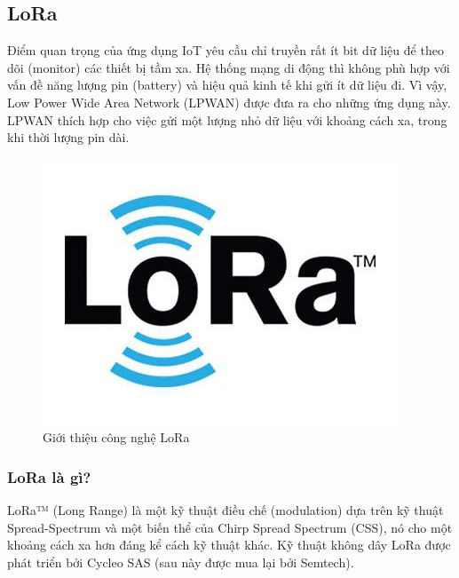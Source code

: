 \subsection{LoRa}
\label{chapterlora}
Điểm quan trọng của ứng dụng IoT yêu cầu chỉ truyền rất ít bit dữ liệu để theo dõi (monitor) các thiết bị tầm xa. Hệ thống mạng di động thì không phù hợp với vấn đề năng lượng pin (battery) và hiệu quả kinh tế khi gửi ít dữ liệu đi. Vì vậy, Low Power Wide Area Network (LPWAN) được đưa ra cho những ứng dụng này. LPWAN thích hợp cho việc gửi một lượng nhỏ dữ liệu với khoảng cách xa, trong khi thời lượng pin dài.
\begin{center}
\begin{figure}[htp]
\begin{center}
\includegraphics[scale=0.55]{image4/introlora.jpg}
\end{center}
\caption{Giới thiệu công nghệ LoRa \cite{tl15}}
\end{figure}
\end{center}
\subsubsection{LoRa là gì?}
LoRa™ \cite{tl14} (Long Range) là một kỹ thuật điều chế (modulation) dựa trên kỹ thuật Spread-Spectrum và một biến thể của Chirp Spread Spectrum (CSS), nó cho một khoảng cách xa hơn đáng kể cách kỹ thuật khác. Kỹ thuật không dây LoRa được phát triển bởi Cycleo SAS (sau này được mua lại bởi Semtech).

